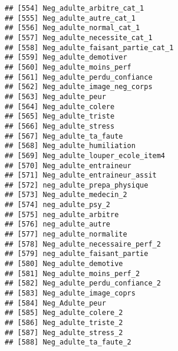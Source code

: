 \documentclass[
]{article}
\begin{document}
\begin{verbatim}
## [554] Neg_adulte_arbitre_cat_1                                         
## [555] Neg_adulte_autre_cat_1                                           
## [556] Neg_adulte_normal_cat_1                                          
## [557] Neg_adulte_necessite_cat_1                                       
## [558] Neg_adulte_faisant_partie_cat_1                                  
## [559] Neg_adulte_demotiver                                             
## [560] Neg_adulte_moins_perf                                            
## [561] Neg_adulte_perdu_confiance                                       
## [562] Neg_adulte_image_neg_corps                                       
## [563] Neg_adulte_peur                                                  
## [564] Neg_adulte_colere                                                
## [565] Neg_adulte_triste                                                
## [566] Neg_adulte_stress                                                
## [567] Neg_adulte_ta_faute                                              
## [568] Neg_adulte_humiliation                                           
## [569] Neg_adulte_louper_ecole_item4                                    
## [570] Neg_adulte_entraineur                                            
## [571] Neg_adulte_entraineur_assit                                      
## [572] neg_adulte_prepa_physique                                        
## [573] Neg_adulte_medecin_2                                             
## [574] neg_adulte_psy_2                                                 
## [575] neg_adulte_arbitre                                               
## [576] neg_adulte_autre                                                 
## [577] neg_adulte_normalite                                             
## [578] Neg_adulte_necessaire_perf_2                                     
## [579] neg_adulte_faisant_partie                                        
## [580] Neg_adulte_demotive                                              
## [581] Neg_adulte_moins_perf_2                                          
## [582] Neg_adulte_perdu_confiance_2                                     
## [583] Neg_adulte_image_coprs                                           
## [584] Neg_Adulte_peur                                                  
## [585] Neg_adulte_colere_2                                              
## [586] Neg_adulte_triste_2                                              
## [587] Neg_adulte_stress_2                                              
## [588] Neg_adulte_ta_faute_2                                            

\end{verbatim}
\end{document}
